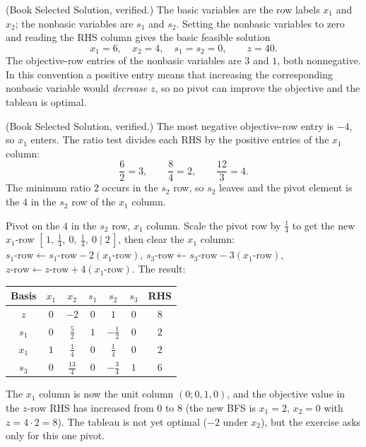 
(Book Selected Solution, verified.) The basic variables are the row
labels $x_1$ and $x_2$; the nonbasic variables are $s_1$ and $s_2$.
Setting the nonbasic variables to zero and reading the RHS column gives
the basic feasible solution
\[
x_1 = 6, \quad x_2 = 4, \quad s_1 = s_2 = 0, \qquad z = 40.
\]
The objective-row entries of the nonbasic variables are $3$ and $1$, both
nonnegative. In this convention a positive entry means that increasing
the corresponding nonbasic variable would \emph{decrease} $z$, so no
pivot can improve the objective and the tableau is optimal.


(Book Selected Solution, verified.) The most negative objective-row
entry is $-4$, so $x_1$ enters. The ratio test divides each RHS by the
positive entries of the $x_1$ column:
\[
\frac{6}{2} = 3, \qquad \frac{8}{4} = 2, \qquad \frac{12}{3} = 4.
\]
The minimum ratio $2$ occurs in the $s_2$ row, so $s_2$ leaves and the
pivot element is the $4$ in the $s_2$ row of the $x_1$ column.


Pivot on the $4$ in the $s_2$ row, $x_1$ column. Scale the pivot row by
$\tfrac14$ to get the new $x_1$-row
$[\,1,\ \tfrac14,\ 0,\ \tfrac14,\ 0 \mid 2\,]$, then clear the $x_1$
column: $s_1\text{-row} \leftarrow s_1\text{-row} - 2(x_1\text{-row})$,
$s_3\text{-row} \leftarrow s_3\text{-row} - 3(x_1\text{-row})$,
$z\text{-row} \leftarrow z\text{-row} + 4(x_1\text{-row})$. The result:
\begin{center}
\renewcommand{\arraystretch}{1.3}
\begin{tabular}{c|ccccc|c}
Basis & $x_1$ & $x_2$ & $s_1$ & $s_2$ & $s_3$ & RHS\\
\hline
$z$   & $0$ & $-2$ & $0$ & $1$ & $0$ & $8$\\
\hline
$s_1$ & $0$ & $\tfrac52$  & $1$ & $-\tfrac12$ & $0$ & $2$\\
$x_1$ & $1$ & $\tfrac14$  & $0$ & $\tfrac14$  & $0$ & $2$\\
$s_3$ & $0$ & $\tfrac{13}{4}$ & $0$ & $-\tfrac34$ & $1$ & $6$\\
\end{tabular}
\end{center}
The $x_1$ column is now the unit column $(0; 0, 1, 0)$, and the objective
value in the $z$-row RHS has increased from $0$ to $8$ (the new BFS is
$x_1 = 2$, $x_2 = 0$ with $z = 4 \cdot 2 = 8$). The tableau is not yet
optimal ($-2$ under $x_2$), but the exercise asks only for this one pivot.

